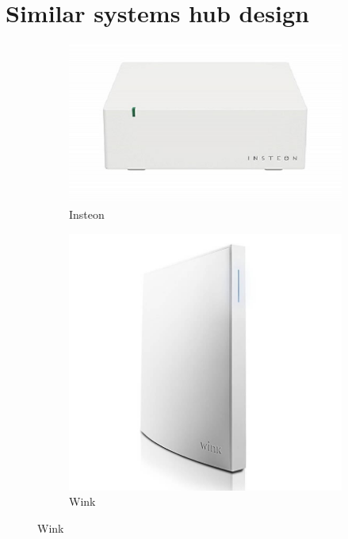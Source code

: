 \documentclass[12pt, oneside, a4paper]{book}
\begin{document}
		\section{Similar systems hub design}
		\label{appendix:similar_system_comparision}
		\begin{figure}[H]
			\begin{subfigure}[b]{.5\linewidth}
				\includegraphics[width=\linewidth]{img/insteon_hw.png}
				\caption{Insteon}
			\end{subfigure}
			\begin{subfigure}[b]{.5\linewidth}
				\includegraphics[width=\linewidth]{img/wink_hw.png}
				\caption{Wink}
			\end{subfigure}

\end{figure}
\end{document}
